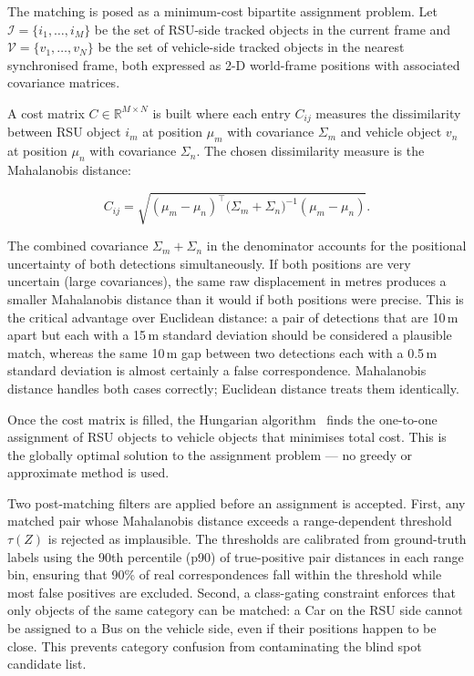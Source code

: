 \documentclass[12pt]{article}
\begin{document}
The matching is posed as a minimum-cost bipartite assignment problem.
Let $\mathcal{I} = \{i_1, \ldots, i_M\}$ be the set of RSU-side tracked
objects in the current frame and $\mathcal{V} = \{v_1, \ldots, v_N\}$
be the set of vehicle-side tracked objects in the nearest synchronised
frame, both expressed as 2-D world-frame positions with associated
covariance matrices.
 
\medskip
A cost matrix $C \in \mathbb{R}^{M \times N}$ is built where each entry
$C_{ij}$ measures the dissimilarity between RSU object $i_m$ at
position $\mu_m$ with covariance $\Sigma_m$ and vehicle object $v_n$ at
position $\mu_n$ with covariance $\Sigma_n$. The chosen dissimilarity
measure is the Mahalanobis distance:
 
\begin{equation}
    C_{ij} = \sqrt{(\mu_m - \mu_n)^{\top}
              \bigl(\Sigma_m + \Sigma_n\bigr)^{-1}
              (\mu_m - \mu_n)}.
    \label{eq:mahal}
\end{equation}
 
\noindent The combined covariance $\Sigma_m + \Sigma_n$ in the
denominator accounts for the positional uncertainty of both detections
simultaneously. If both positions are very uncertain (large covariances),
the same raw displacement in metres produces a smaller Mahalanobis
distance than it would if both positions were precise. This is the
critical advantage over Euclidean distance: a pair of detections that
are 10\,m apart but each with a 15\,m standard deviation should be
considered a plausible match, whereas the same 10\,m gap between two
detections each with a 0.5\,m standard deviation is almost certainly a
false correspondence. Mahalanobis distance handles both cases correctly;
Euclidean distance treats them identically.
 
\medskip
Once the cost matrix is filled, the Hungarian
algorithm~\cite{kuhn1955hungarian} finds the one-to-one assignment of
RSU objects to vehicle objects that minimises total cost. This is the
globally optimal solution to the assignment problem --- no greedy or
approximate method is used.
 
\medskip
Two post-matching filters are applied before an assignment is accepted.
First, any matched pair whose Mahalanobis distance exceeds a
range-dependent threshold $\tau(Z)$ is rejected as implausible. The
thresholds are calibrated from ground-truth labels using the 90th
percentile (p90) of true-positive pair distances in each range bin,
ensuring that 90\% of real correspondences fall within the threshold
while most false positives are excluded. Second, a class-gating
constraint enforces that only objects of the same category can be
matched: a Car on the RSU side cannot be assigned to a Bus on the vehicle
side, even if their positions happen to be close. This prevents category
confusion from contaminating the blind spot candidate list.
 
\end{document}
